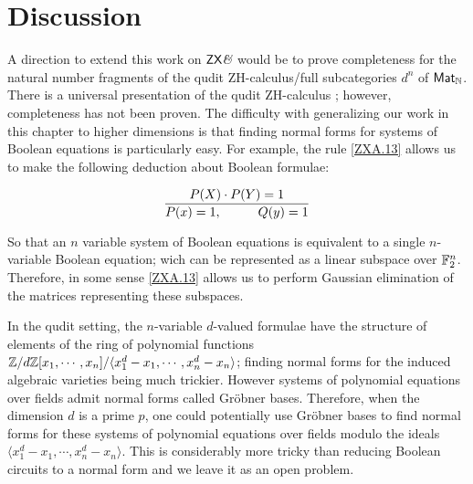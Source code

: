 
\section{Discussion}


A  direction to extend this work on $\mathsf{ZX}\textit{\&}$ would be to prove completeness for the natural number fragments of the qudit ZH-calculus/full subcategories $d^n$ of $\mathsf{Mat}_{\mathbb{N}}$.  There is a universal presentation of the qudit ZH-calculus \cite{roy}; however, completeness has not been proven.  The difficulty with generalizing our work in this chapter to higher dimensions is that finding normal forms for systems of Boolean equations is particularly easy.  For example, the rule \ref{ZXA.13} allows us to make the following deduction about Boolean formulae:

$$
\dfrac{P(X)\cdot P(Y)=1}{P(x)=1,\hspace*{1cm}Q(y)=1}
$$

So that an $n$ variable system of Boolean equations is equivalent to a single $n$-variable Boolean equation; wich can be represented as a linear subspace over $\mathbb{F}_2^n$. Therefore, in some sense \ref{ZXA.13} allows us to perform Gaussian elimination of the matrices representing these subspaces.
 
In the qudit setting, the $n$-variable $d$-valued formulae have the structure of elements of the ring of polynomial functions $\mathbb{Z}/d\mathbb{Z}[x_1,\cdots, x_{n}]/\langle x_1^d-x_1,\cdots, x_n^d-x_n\rangle$; finding normal forms for the induced algebraic varieties being much trickier. 
However systems of polynomial equations over fields admit normal forms called Gr\"obner bases.  Therefore,  when the dimension $d$ is a prime $p$, one could potentially use  Gr\"obner bases to find normal forms for these systems of polynomial equations over fields  modulo the  ideals $\langle x_1^d-x_1,\cdots, x_n^d-x_n\rangle$.   This is considerably more tricky than reducing Boolean circuits to a normal form and we leave it as an open problem.
